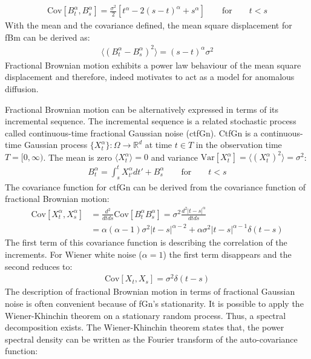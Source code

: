 \documentclass[
  a4paper,BCOR10mm,twoside,
  headsepline,footsepline,%
  fleqn,openbib
]{scrbook}
\begin{document}
\begin{align}
\mathrm{Cov}[B^{\alpha}_t,B^{\alpha}_s]=\frac{\sigma^2}{2}[t^{\alpha}-2(s-t)^{\alpha}+s^{\alpha}] \qquad \text{for} \qquad t<s \label{correlationfunctionfbm}
\end{align}
With the mean and the covariance defined, the mean square displacement for fBm can be derived as: 
\begin{align}
\label{MSDfbm}
 \langle (B^{\alpha}_{t}-B^{\alpha}_{s})^2 \rangle = (s-t)^\alpha \sigma^2
\end{align}
Fractional Brownian motion exhibits a power law behaviour of the mean square displacement and therefore, indeed motivates to act as a model for anomalous diffusion.\par Fractional Brownian motion can be alternatively expressed in terms of its incremental sequence. The incremental sequence is a related stochastic process called continuous-time fractional Gaussian noise (ctfGn). CtfGn is a continuous-time Gaussian process $\{X^{\alpha}_t\}: \Omega \rightarrow \mathbb{R}^d$ at time $t \in T$ in the observation time $T =[0, \infty)$. The mean is zero  $\langle X^{\alpha}_t \rangle=0$   and variance $\mathrm{Var}[X^{\alpha}_t]= \langle (X^{\alpha}_t)^2 \rangle=\sigma^2$:
\begin{align}
  B^{\alpha}_t=\int^t_s X^{\alpha}_{t'} d t' +  B^{\alpha}_s \qquad \text{for} \qquad t<s
\end{align}
The covariance function for ctfGn can be derived from the covariance function of fractional Brownian motion:
\begin{align}
\mathrm{Cov}[X^{\alpha}_t,X^{\alpha}_s]&= \frac{d^2}{dt ds} \mathrm{Cov}[B^{\alpha}_t B^{\alpha}_s]=\sigma^2 \frac{d^2 |t-s|^{\alpha}}{dtds} \label{eq:covfgn} \\
 &=\alpha (\alpha-1) \sigma^2 |t-s|^{\alpha-2}+\alpha \sigma^2 |t-s|^{\alpha-1} \delta(t-s) \label{eq:covfgn1}
\end{align}
The first term of this covariance function is describing the correlation of the increments. For Wiener white noise ($\alpha=1$) the first term disappears and the second reduces to:
\begin{align}
 \mathrm{Cov}[X_t,X_s]= \sigma^2 \delta(t-s)
\end{align}
The description of fractional Brownian motion in terms of fractional Gaussian noise is often convenient because of fGn's stationarity. It is possible to apply the Wiener-Khinchin theorem on a stationary random process. Thus, a spectral decomposition exists. The Wiener-Khinchin theorem states that, the power spectral density can be written as the Fourier transform of the auto-covariance function:
\end{document}
